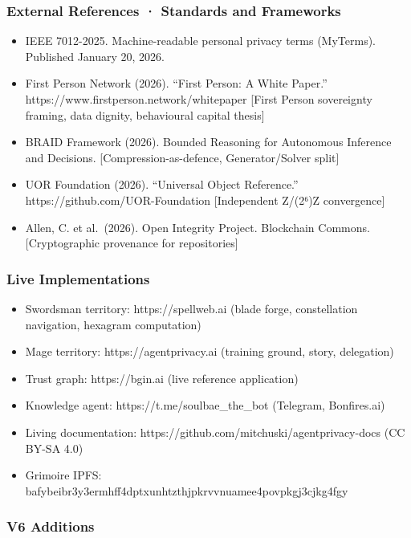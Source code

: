 \documentclass[
  11pt,
]{article}
\providecommand{\tightlist}{%
  \setlength{\itemsep}{0pt}\setlength{\parskip}{0pt}}
\begin{document}
\subsubsection{External References · Standards and
Frameworks}\label{external-references-standards-and-frameworks}

\begin{itemize}
\tightlist
\item
  IEEE 7012-2025. Machine-readable personal privacy terms (MyTerms).
  Published January 20, 2026.
\item
  First Person Network (2026). ``First Person: A White Paper.''
  https://www.firstperson.network/whitepaper {[}First Person sovereignty
  framing, data dignity, behavioural capital thesis{]}
\item
  BRAID Framework (2026). Bounded Reasoning for Autonomous Inference and
  Decisions. {[}Compression-as-defence, Generator/Solver split{]}
\item
  UOR Foundation (2026). ``Universal Object Reference.''
  https://github.com/UOR-Foundation {[}Independent Z/(2⁶)Z
  convergence{]}
\item
  Allen, C. et al.~(2026). Open Integrity Project. Blockchain Commons.
  {[}Cryptographic provenance for repositories{]}
\end{itemize}

\subsubsection{Live Implementations}\label{live-implementations}

\begin{itemize}
\tightlist
\item
  Swordsman territory: https://spellweb.ai (blade forge, constellation
  navigation, hexagram computation)
\item
  Mage territory: https://agentprivacy.ai (training ground, story,
  delegation)
\item
  Trust graph: https://bgin.ai (live reference application)
\item
  Knowledge agent: https://t.me/soulbae\_the\_bot (Telegram,
  Bonfires.ai)
\item
  Living documentation: https://github.com/mitchuski/agentprivacy-docs
  (CC BY-SA 4.0)
\item
  Grimoire IPFS:
  bafybeibr3y3ermhff4dptxunhtzthjpkrvvnuamee4povpkgj3cjkg4fgy
\end{itemize}

\subsubsection{V6 Additions}\label{v6-additions}
\end{document}
